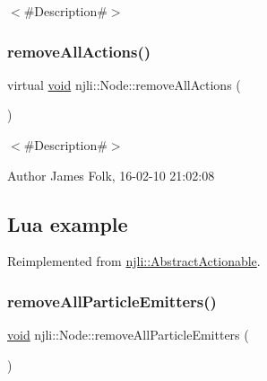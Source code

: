 $<$\#\+Description\#$>$ \mbox{\label{classnjli_1_1_node_ad497289960419c904082516aab4ab551}} 
\subsubsection{\texorpdfstring{remove\+All\+Actions()}{removeAllActions()}\hspace{0.1cm}{\footnotesize\ttfamily [2/2]}}
{\footnotesize\ttfamily virtual \mbox{\hyperlink{_thread_8h_af1e856da2e658414cb2456cb6f7ebc66}{void}} njli\+::\+Node\+::remove\+All\+Actions (\begin{DoxyParamCaption}{ }\end{DoxyParamCaption})\hspace{0.3cm}{\ttfamily [virtual]}}



$<$\#\+Description\#$>$ 

\begin{DoxyAuthor}{Author}
James Folk, 16-\/02-\/10 21\+:02\+:08
\end{DoxyAuthor}
\hypertarget{classnjli_1_1_steering_behavior_wander_ex1}{}\subsection{Lua example}\label{classnjli_1_1_steering_behavior_wander_ex1}

\begin{DoxyCodeInclude}
\end{DoxyCodeInclude}


Reimplemented from \mbox{\hyperlink{classnjli_1_1_abstract_actionable_a758cc11b09194399de63537e0f7e1485}{njli\+::\+Abstract\+Actionable}}.

\mbox{\label{classnjli_1_1_node_a444e78b0de3fa1072ac008331ec18457}} 
\subsubsection{\texorpdfstring{remove\+All\+Particle\+Emitters()}{removeAllParticleEmitters()}}
{\footnotesize\ttfamily \mbox{\hyperlink{_thread_8h_af1e856da2e658414cb2456cb6f7ebc66}{void}} njli\+::\+Node\+::remove\+All\+Particle\+Emitters (\begin{DoxyParamCaption}{ }\end{DoxyParamCaption})}



